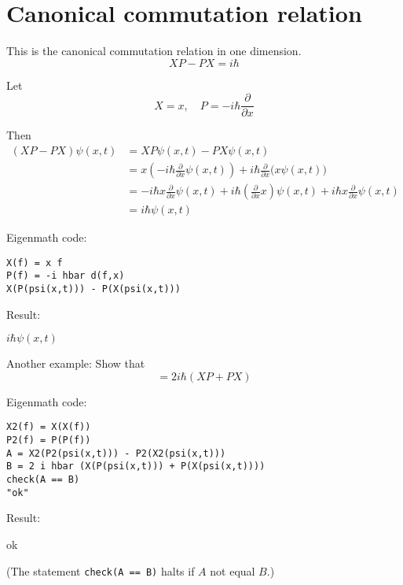 

\section*{Canonical commutation relation}

\iffalse
Fedak  and Prentis write
\begin{quote}
The theory of Fourier and the correspondence principle of Bohr
played a vital role in Heisenberg's development of quantum mechanics.
\end{quote}

Aitchison, MacManus, and Snyder write
\begin{quote}
This `difficulty’ clearly unsettled Heisenberg: but it very
quickly became clear that the non-commutativity (in general) of kinematical
quantities in quantum theory was the really essential new technical idea in the
paper.
\end{quote}
\fi

This is the canonical commutation relation in one dimension.
\begin{equation*}
XP-PX=i\hbar
\end{equation*}

Let
\begin{equation*}
X=x,\quad P=-i\hbar\frac{\partial}{\partial x}
\end{equation*}

Then
\begin{align*}
(XP-PX)\psi(x,t)&=XP\psi(x,t)-PX\psi(x,t)
\\
&=x\left(-i\hbar\frac{\partial}{\partial x}\psi(x,t)\right)
+i\hbar\frac{\partial}{\partial x}\bigl(x\psi(x,t)\bigr)
\\
&=-i\hbar x\frac{\partial}{\partial x}\psi(x,t)
+i\hbar\left(\frac{\partial}{\partial x}x\right)\psi(x,t)
+i\hbar x\frac{\partial}{\partial x}\psi(x,t)
\\
&=i\hbar\psi(x,t)
\end{align*}

Eigenmath code:
{\color{blue}
\begin{verbatim}
X(f) = x f
P(f) = -i hbar d(f,x)
X(P(psi(x,t))) - P(X(psi(x,t)))
\end{verbatim}}

Result:

\bigskip
$i\hbar\psi(x,t)$

\bigskip
Another example: Show that
\begin{equation*}
[X^2,P^2]=2i\hbar(XP+PX)
\end{equation*}

Eigenmath code:
{\color{blue}
\begin{verbatim}
X2(f) = X(X(f))
P2(f) = P(P(f))
A = X2(P2(psi(x,t))) - P2(X2(psi(x,t)))
B = 2 i hbar (X(P(psi(x,t))) + P(X(psi(x,t))))
check(A == B)
"ok"
\end{verbatim}}

Result:

\bigskip
ok

\bigskip
(The statement {\tt check(A == B)} halts if $A$ not equal $B$.)

